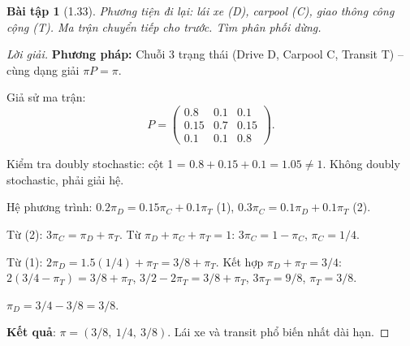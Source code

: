\documentclass[8pt,a4paper]{article}
\newtheorem{exercise}{Bài tập}
\newenvironment{solution}{\begin{proof}[Lời giải]}{\end{proof}}
\begin{document}
\begin{exercise}[1.33]
Phương tiện đi lại: lái xe (D), carpool (C), giao thông công cộng (T). Ma trận chuyển tiếp cho trước. Tìm phân phối dừng.
\end{exercise}
\begin{solution}
\textbf{Phương pháp:} Chuỗi 3 trạng thái (Drive D, Carpool C, Transit T) -- cùng dạng giải $\pi P = \pi$.

Giả sử ma trận:
\[
  P = \begin{pmatrix} 0.8 & 0.1 & 0.1 \\ 0.15 & 0.7 & 0.15 \\ 0.1 & 0.1 & 0.8 \end{pmatrix}.
\]

Kiểm tra doubly stochastic: cột 1 = $0.8 + 0.15 + 0.1 = 1.05 \neq 1$. Không doubly stochastic, phải giải hệ.

Hệ phương trình: $0.2\pi_D = 0.15\pi_C + 0.1\pi_T$ (1), $0.3\pi_C = 0.1\pi_D + 0.1\pi_T$ (2).

Từ (2): $3\pi_C = \pi_D + \pi_T$. Từ $\pi_D + \pi_C + \pi_T = 1$: $3\pi_C = 1 - \pi_C$, $\pi_C = 1/4$.

Từ (1): $2\pi_D = 1.5(1/4) + \pi_T = 3/8 + \pi_T$. Kết hợp $\pi_D + \pi_T = 3/4$: $2(3/4 - \pi_T) = 3/8 + \pi_T$, $3/2 - 2\pi_T = 3/8 + \pi_T$, $3\pi_T = 9/8$, $\pi_T = 3/8$.

$\pi_D = 3/4 - 3/8 = 3/8$.

\textbf{Kết quả}: $\pi = (3/8,\ 1/4,\ 3/8)$. Lái xe và transit phổ biến nhất dài hạn.
\end{solution}
\end{document}

